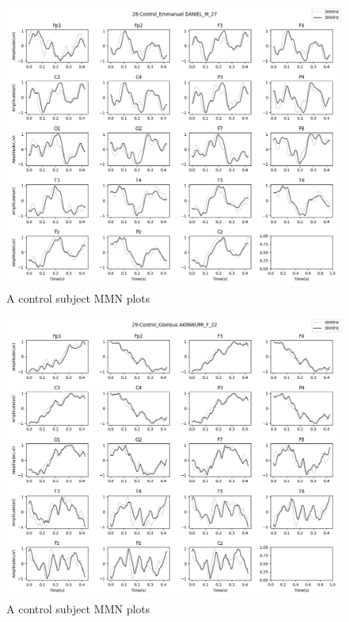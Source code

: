 \documentclass[10pt]{article}
\begin{document}
\begin{figure}[H]
  \includegraphics[width=16cm]{../../../data_analysis_results/MMN/time_series/Control/28.png}
  \caption{A control subject MMN plots}
\end{figure}
\begin{figure}[H]
  \includegraphics[width=16cm]{../../../data_analysis_results/MMN/time_series/Control/29.png}
  \caption{A control subject MMN plots}
\end{figure}
\end{document}
